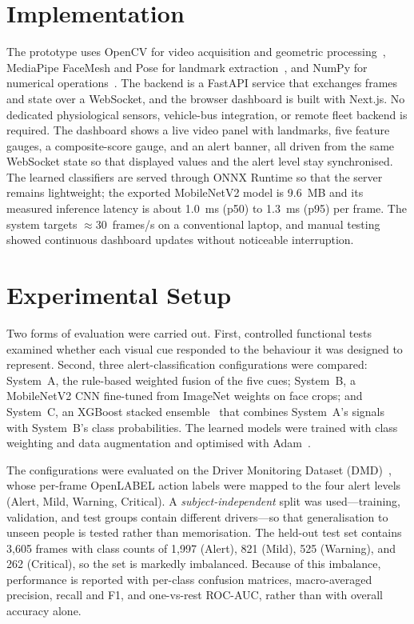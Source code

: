 \documentclass[conference]{IEEEtran}
\begin{document}
\section{Implementation}
The prototype uses OpenCV for video acquisition and geometric processing~\cite{bradski}, MediaPipe FaceMesh and Pose for landmark extraction~\cite{lugaresi}, and NumPy for numerical operations~\cite{harris_numpy}. The backend is a FastAPI service that exchanges frames and state over a WebSocket, and the browser dashboard is built with Next.js. No dedicated physiological sensors, vehicle-bus integration, or remote fleet backend is required. The dashboard shows a live video panel with landmarks, five feature gauges, a composite-score gauge, and an alert banner, all driven from the same WebSocket state so that displayed values and the alert level stay synchronised. The learned classifiers are served through ONNX Runtime so that the server remains lightweight; the exported MobileNetV2 model is 9.6~MB and its measured inference latency is about 1.0~ms (p50) to 1.3~ms (p95) per frame. The system targets $\approx$30~frames/s on a conventional laptop, and manual testing showed continuous dashboard updates without noticeable interruption.

\section{Experimental Setup}
Two forms of evaluation were carried out. First, controlled functional tests examined whether each visual cue responded to the behaviour it was designed to represent. Second, three alert-classification configurations were compared: System~A, the rule-based weighted fusion of the five cues; System~B, a MobileNetV2 CNN fine-tuned from ImageNet weights on face crops; and System~C, an XGBoost stacked ensemble~\cite{chen_xgboost} that combines System~A's signals with System~B's class probabilities. The learned models were trained with class weighting and data augmentation and optimised with Adam~\cite{kingma}.

The configurations were evaluated on the Driver Monitoring Dataset (DMD)~\cite{ortega_dmd}, whose per-frame OpenLABEL action labels were mapped to the four alert levels (Alert, Mild, Warning, Critical). A \emph{subject-independent} split was used---training, validation, and test groups contain different drivers---so that generalisation to unseen people is tested rather than memorisation. The held-out test set contains 3{,}605 frames with class counts of 1{,}997 (Alert), 821 (Mild), 525 (Warning), and 262 (Critical), so the set is markedly imbalanced. Because of this imbalance, performance is reported with per-class confusion matrices, macro-averaged precision, recall and F1, and one-vs-rest ROC-AUC, rather than with overall accuracy alone.
\end{document}
